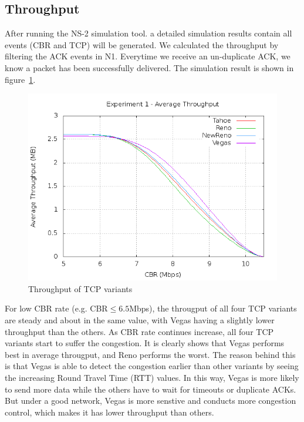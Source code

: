 \documentclass[10pt, conference]{lib/IEEEtran}
\begin{document}
\subsection{Throughput}
After running the NS-2 simulation tool. a detailed simulation results 
contain all events (CBR and TCP) will be generated. We calculated the
 throughput by filtering the ACK events in N1. Everytime we receive an
 un-duplicate ACK, we know a packet has been successfully delivered. 
 The simulation result is shown in figure~\ref{fig:exp1_thp}.
\begin{figure}[!htb]
    \centering
    \includegraphics[width=1.0\linewidth]{plot/exp1-thp.png}
    \caption{Throughput of TCP variants}
    \label{fig:exp1_thp}
\end{figure}
For low CBR rate (e.g. CBR$ \le 6.5$Mbps), the througput of all four TCP 
variants are steady and about in the same value, with Vegas having a 
slightly lower throughput than the others. As CBR rate continues 
increase, all four TCP variants start to suffer the congestion. It is 
clearly shows that Vegas performs best in average througput, and Reno
performs the worst. The reason behind this is that Vegas is able to 
detect the congestion earlier than other variants by seeing the 
increasing Round Travel Time (RTT) values. In this way, Vegas is more 
likely to send more data while the others have to wait for timeouts or 
duplicate ACKs. But under a good network, Vegas is more senstive and 
conducts more congestion control, which makes it has lower throughput 
than others.
\end{document}
